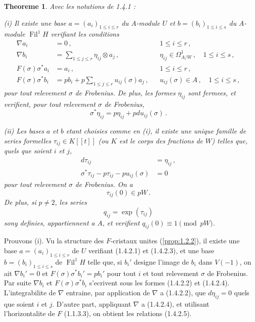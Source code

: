 \documentclass[12pt,a4paper]{article}
\theoremstyle{plain}
\newtheorem{theorem}{Theoreme}[section]
\theoremstyle{definition}
\theoremstyle{remark}
\DeclareMathOperator{\Fil}{Fil}
\begin{document}
\begin{theorem}\label{thm:1.4.2}
Avec les notations de \emph{1.4.1} :

\emph{(i)} Il existe une base $a = (a_i)_{1 \leq i \leq r}$ du $A$-module $U$ et $b = (b_i)_{1 \leq i \leq s}$ du $A$-module $\Fil^1H$ verifiant les conditions
\begin{align}
\nabla a_i &= 0\,, && 1 \leq i \leq r\,, \label{eq:1.4.2.1} \\
\nabla b_i &= \sum_{1 \leq j \leq r} \eta_{ij} \otimes a_j\,, && \eta_{ij} \in \Omega^1_{A/W}\,, \quad 1 \leq i \leq s\,, \label{eq:1.4.2.2} \\
F(\sigma)\sigma^*a_i &= a_i\,, && 1 \leq i \leq r\,, \label{eq:1.4.2.3} \\
F(\sigma)\sigma^*b_i &= pb_i + p\sum_{1 \leq j \leq r} u_{ij}(\sigma)a_j\,, && u_{ij}(\sigma) \in A\,, \quad 1 \leq i \leq s\,, \label{eq:1.4.2.4}
\end{align}
pour tout relevement $\sigma$ de Frobenius. De plus, les formes $\eta_{ij}$ sont fermees, et verifient, pour tout relevement $\sigma$ de Frobenius,
\begin{equation}\label{eq:1.4.2.5}
\sigma^*\eta_{ij} = p\eta_{ij} + pdu_{ij}(\sigma)\,.\end{equation}

\emph{(ii)} Les bases $a$ et $b$ etant choisies comme en (i), il existe une unique famille de series formelles $\tau_{ij} \in K[[t]]$ (ou $K$ est le corps des fractions de $W$) telles que, quels que soient $i$ et $j$,
\begin{align}
d\tau_{ij} &= \eta_{ij}\,, \label{eq:1.4.2.6} \\
\sigma^*\tau_{ij} - p\tau_{ij} - pu_{ij}(\sigma) &= 0 \label{eq:1.4.2.7}
\end{align}
pour tout relevement $\sigma$ de Frobenius. On a
\begin{equation}\label{eq:1.4.2.8}
\tau_{ij}(0) \in pW\,.\end{equation}
De plus, si $p \neq 2$, les series
\begin{equation}\label{eq:1.4.2.9}
q_{ij} = \exp(\tau_{ij})\end{equation}
sony definies, appartiennent a $A$, et verifient $q_{ij}(0) \equiv 1 \pmod{pW}$.
\end{theorem}

Prouvons (i). Vu la structure des $F$-cristaux unites (\ref{prop:1.2.2}), il existe une base $a = (a_i)_{1 \leq i \leq r}$ de $U$ verifiant (1.4.2.1) et (1.4.2.3), et une base $b = (b_i)_{1 \leq i \leq s}$ de $\Fil^1H$ telle que, si $b_i'$ designe l'image de $b_i$ dans $V(-1)$, on ait $\nabla b_i' = 0$ et $F(\sigma)\sigma^*b_i' = pb_i'$ pour tout $i$ et tout relevement $\sigma$ de Frobenius. Par suite $\nabla b_i$ et $F(\sigma)\sigma^*b_i$ s'ecrivent sous les formes (1.4.2.2) et (1.4.2.4). L'integrabilite de $\nabla$ entraine, par application de $\nabla$ a (1.4.2.2), que $d\eta_{ij} = 0$ quels que soient $i$ et $j$. D'autre part, appliquant $\nabla$ a (1.4.2.4), et utilisant l'horizontalite de $F$ (1.1.3.3), on obtient les relations (1.4.2.5).
\end{document}
